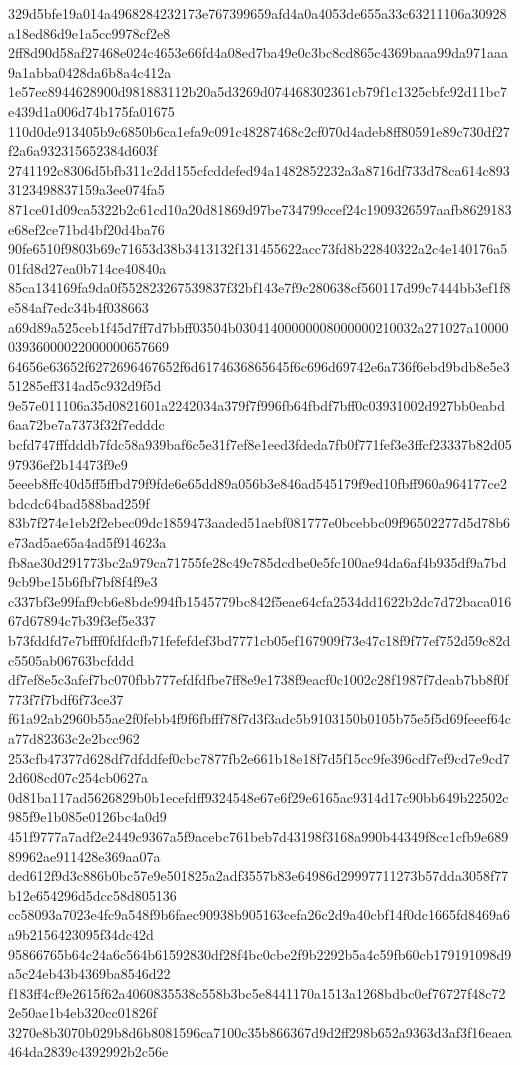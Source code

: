 {329d5bfe19a014a4968284232173e767399659afd4a0a4053de655a33c63211106a30928a18ed86d9e1a5cc9978cf2e8
2ff8d90d58af27468e024c4653e66fd4a08ed7ba49e0c3bc8cd865c4369baaa99da971aaa9a1abba0428da6b8a4c412a
1e57ec8944628900d981883112b20a5d3269d074468302361cb79f1c1325cbfc92d11bc7e439d1a006d74b175fa01675
110d0de913405b9c6850b6ca1efa9c091c48287468c2cf070d4adeb8ff80591e89c730df27f2a6a932315652384d603f
2741192c8306d5bfb311c2dd155cfcddefed94a1482852232a3a8716df733d78ca614c8933123498837159a3ee074fa5
871ce01d09ca5322b2c61cd10a20d81869d97be734799ccef24c1909326597aafb8629183e68ef2ce71bd4bf20d4ba76
90fe6510f9803b69c71653d38b3413132f131455622acc73fd8b22840322a2c4e140176a501fd8d27ea0b714ce40840a
85ca134169fa9da0f552823267539837f32bf143e7f9c280638cf560117d99c7444bb3ef1f8e584af7edc34b4f038663
a69d89a525ceb1f45d7ff7d7bbff03504b03041400000008000000210032a271027a1000003936000022000000657669
64656e63652f6272696467652f6d6174636865645f6c696d69742e6a736f6ebd9bdb8e5e351285eff314ad5c932d9f5d
9e57e011106a35d0821601a2242034a379f7f996fb64fbdf7bff0c03931002d927bb0eabd6aa72be7a7373f32f7edddc
bcfd747fffdddb7fdc58a939baf6c5e31f7ef8e1eed3fdeda7fb0f771fef3e3ffcf23337b82d0597936ef2b14473f9e9
5eeeb8ffc40d5ff5ffbd79f9fde6e65dd89a056b3e846ad545179f9ed10fbff960a964177ce2bdcdc64bad588bad259f
83b7f274e1eb2f2ebec09dc1859473aaded51aebf081777e0bcebbc09f96502277d5d78b6e73ad5ae65a4ad5f914623a
fb8ae30d291773bc2a979ca71755fe28c49c785dcdbe0e5fc100ae94da6af4b935df9a7bd9cb9be15b6fbf7bf8f4f9e3
c337bf3e99faf9cb6e8bde994fb1545779bc842f5eae64cfa2534dd1622b2dc7d72baca01667d67894c7b39f3ef5e337
b73fddfd7e7bfff0fdfdcfb71fefefdef3bd7771cb05ef167909f73e47c18f9f77ef752d59c82dc5505ab06763bcfddd
df7ef8e5c3afef7bc070fbb777efdfdfbe7ff8e9e1738f9eacf0c1002c28f1987f7deab7bb8f0f773f7f7bdf6f73ce37
f61a92ab2960b55ae2f0febb4f9f6fbfff78f7d3f3adc5b9103150b0105b75e5f5d69feeef64ca77d82363c2e2bcc962
253cfb47377d628df7dfddfef0cbc7877fb2e661b18e18f7d5f15cc9fe396cdf7ef9cd7e9cd72d608cd07c254cb0627a
0d81ba117ad5626829b0b1ecefdff9324548e67e6f29e6165ac9314d17c90bb649b22502c985f9e1b085e0126bc4a0d9
451f9777a7adf2e2449c9367a5f9acebc761beb7d43198f3168a990b44349f8cc1cfb9e68989962ae911428e369aa07a
ded612f9d3c886b0bc57e9e501825a2adf3557b83e64986d29997711273b57dda3058f77b12e654296d5dcc58d805136
cc58093a7023e4fc9a548f9b6faec90938b905163cefa26c2d9a40cbf14f0dc1665fd8469a6a9b2156423095f34dc42d
95866765b64c24a6c564b61592830df28f4bc0cbe2f9b2292b5a4c59fb60cb179191098d9a5c24eb43b4369ba8546d22
f183ff4cf9e2615f62a4060835538c558b3bc5e8441170a1513a1268bdbc0ef76727f48c722e50ae1b4eb320cc01826f
3270e8b3070b029b8d6b8081596ca7100c35b866367d9d2ff298b652a9363d3af3f16eaea464da2839c4392992b2c56e
}
